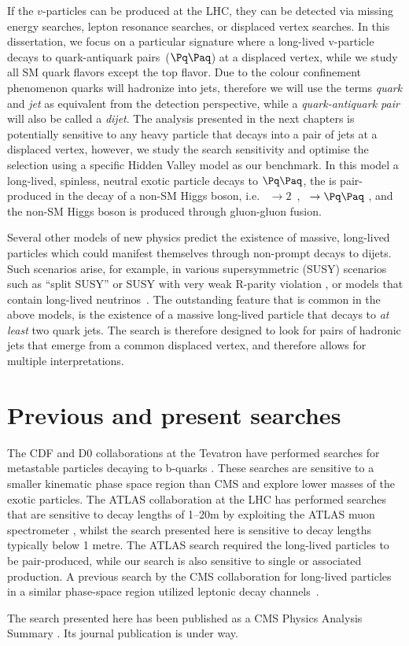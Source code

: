 If the $v$-particles can be produced at the LHC, they can be detected via missing energy 
searches, lepton resonance searches, or displaced vertex searches. In this dissertation,
we focus on a particular signature where a long-lived v-particle 
decays to quark-antiquark pairs~($\qq$) at a displaced vertex,
 while we study all SM quark flavors except the top flavor. Due to the colour confinement 
phenomenon quarks
will hadronize into jets, therefore we will use the terms {\it quark} and  {\it jet} as 
 equivalent from the detection perspective,
while a {\it quark-antiquark pair} will also be called a {\it dijet}.
The analysis presented in the next chapters is potentially sensitive 
to any heavy particle that decays into a pair of jets 
 at a displaced vertex, however, we study the search sensitivity and optimise the selection
 using a 
specific Hidden Valley
model as our benchmark. In this model a long-lived, spinless, neutral
exotic particle \X decays to $\qq$,
 the \X is pair-produced in the decay of a non-SM Higgs boson, i.e.  \Higgs~$\to
2$\X~, \X~$\to \qq$ \cite{Strassler:2006ri}, and 
the non-SM Higgs boson is produced through gluon-gluon
fusion. 

Several other models of new physics predict the existence of massive, 
long-lived particles which could
manifest themselves through non-prompt decays to dijets. Such scenarios arise, for example,
in various supersymmetric (SUSY) scenarios such as ``split SUSY''
\cite{Hewett:2004nw} or SUSY with very weak R-parity violation \cite{Barbier:2004ez}, 
or \Zprime models
that contain long-lived neutrinos~\cite{Basso:2008iv}. 
The outstanding feature that is common in the above models,
is the existence of a massive long-lived particle that decays to {\it at least} two
quark jets. The search is therefore designed to look for pairs of hadronic jets
 that emerge from a common displaced vertex, and therefore allows
for multiple interpretations.

\section{Previous and present searches}

The CDF and D0 collaborations at the Tevatron have performed searches for metastable particles decaying to b-quarks
\cite{Aaltonen:2011rja, Abazov:2009ik}.
These searches are sensitive to a smaller kinematic phase space region than CMS and explore
lower masses of the exotic particles. The ATLAS collaboration
at the LHC has performed searches that are sensitive to decay lengths of 1--20\unit{m} by exploiting the ATLAS muon
 spectrometer \cite{ATLAS:2012av}, whilst the search presented here is sensitive to decay lengths 
typically below 1 metre.
 The ATLAS search required the long-lived particles to be pair-produced,
while our search
is also sensitive to single or associated production.
A previous search by the CMS collaboration for long-lived particles in a similar phase-space region utilized leptonic decay channels~\cite{Chatrchyan:2012jna}.

The search presented here has been published as a CMS Physics Analysis Summary 
\cite{CMS-PAS-EXO-12-038}. Its journal publication is under way.
